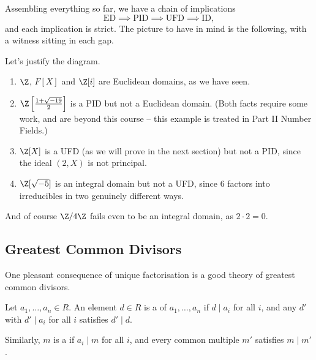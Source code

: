 Assembling everything so far, we have a chain of implications
$$
\text{ED} \implies \text{PID} \implies \text{UFD} \implies \text{ID},
$$
and each implication is strict. The picture to have in mind is the following, with a witness sitting in each gap.

\begin{center}
\end{center}

\begin{example}
	Let's justify the diagram.
	\begin{enumerate}[label=(\roman*)]
		\item $\Z$, $F[X]$ and $\Z[i]$ are Euclidean domains, as we have seen.
		\item $\Z\left[\frac{1 + \sqrt{-19}}{2}\right]$ is a PID but not a Euclidean domain. (Both facts require some work, and are beyond this course -- this example is treated in Part II Number Fields.)
		\item $\Z[X]$ is a UFD (as we will prove in the next section) but not a PID, since the ideal $(2, X)$ is not principal.
		\item $\Z[\sqrt{-5}]$ is an integral domain but not a UFD, since $6$ factors into irreducibles in two genuinely different ways.
	\end{enumerate}
	And of course $\Z/4\Z$ fails even to be an integral domain, as $2 \cdot 2 = 0$.
\end{example}

\subsection{Greatest Common Divisors}

One pleasant consequence of unique factorisation is a good theory of greatest common divisors.

\begin{definition}
	Let $a_1, \dots, a_n \in R$. An element $d \in R$ is a  of $a_1, \dots, a_n$ if $d \mid a_i$ for all $i$, and any $d'$ with $d' \mid a_i$ for all $i$ satisfies $d' \mid d$.

	Similarly, $m$ is a  if $a_i \mid m$ for all $i$, and every common multiple $m'$ satisfies $m \mid m'$.
\end{definition}

